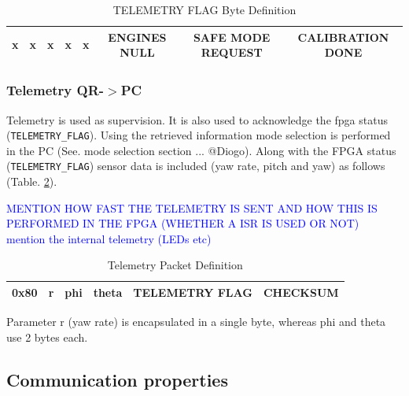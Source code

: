 \documentclass{article}
\newcommand\todo[1]{\textcolor{blue}{#1}} %
\begin{document}
\begin{table}[h]
\centering
\caption{TELEMETRY FLAG Byte Definition}
\begin{tabular}{|c|c|c|c|c|c|c|c|}
\hline 
x & x & x & x & x & ENGINES NULL & SAFE MODE REQUEST & CALIBRATION DONE \\
\hline 
\end{tabular} 
\label{tbl:TelFlagDef}
\end{table}

\subsubsection{Telemetry QR-$>$PC}

Telemetry is used as supervision. It is also used to acknowledge the fpga status (\texttt{TELEMETRY\_FLAG}). Using the retrieved information mode selection is performed in the PC (See. mode selection section ... @Diogo). Along with the FPGA status (\texttt{TELEMETRY\_FLAG}) sensor data is included (yaw rate, pitch and yaw) as follows (Table. \ref{tbl:TelPkgDefinition}). 

\todo{ MENTION HOW FAST THE TELEMETRY IS SENT AND HOW THIS IS PERFORMED IN THE FPGA (WHETHER A ISR IS USED OR NOT)}\\

\todo{mention the internal telemetry (LEDs etc)}

\begin{table}[ht]
\centering
\caption{Telemetry Packet Definition}
\begin{tabular}{|c|c|c|c|c|c|}
\hline 
0x80 & r & phi & theta & TELEMETRY FLAG & CHECKSUM \\
\hline 
\end{tabular} 
\label{tbl:TelPkgDefinition}
\end{table}

Parameter r (yaw rate) is encapsulated in a single byte, whereas phi and theta use 2 bytes each.

% 

\subsection{Communication properties}
\end{document}
